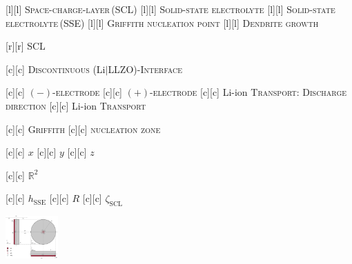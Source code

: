 [l][l] {\scriptsize \textsc{Space-charge-layer\,(SCL)}}
[l][l]  {\scriptsize \textsc{Solid-state electrolyte}}
[l][l]  {\scriptsize \textsc{Solid-state electrolyte\,(SSE)}}
[l][l] {\scriptsize \textsc{Griffith nucleation point}}
[l][l] {\scriptsize \textsc{Dendrite growth}}

[r][r]  {\tiny \textsc{SCL}}

[c][c] {\scriptsize \textsc{Discontinuous} (Li$|$LLZO)-\textsc{Interface}}

[c][c] {\scriptsize $(-)$-\textsc{electrode}}
[c][c] {\scriptsize $(+)$-\textsc{electrode}}
[c][c] {\scriptsize Li-ion \textsc{Transport}: \textsc{Discharge direction}}
[c][c] {\scriptsize Li-ion \textsc{Transport}}

[c][c]   {\textsc{Griffith}}
[c][c] {\textsc{nucleation zone}}

[c][c] {\scriptsize $x$}
[c][c] {\scriptsize $y$}
[c][c] {\scriptsize $z$}

[c][c] {\scriptsize $\mathbb{R}^{2}$}

[c][c]  {\scriptsize $h_{\text{SSE}}$}
[c][c] {\scriptsize $R$}
[c][c] {\scriptsize $\zeta_{\text{SCL}}$}

\includegraphics[width=0.15\textwidth]{space_charge_layer.eps}